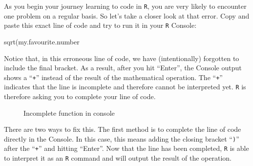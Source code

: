 \documentclass[
  letterpaper,
  DIV=11,
  numbers=noendperiod,
  oneside]{scrreprt}
\newenvironment{Shaded}{\begin{snugshade}}{\end{snugshade}}
\newcommand{\FunctionTok}[1]{\textcolor[rgb]{0.28,0.35,0.67}{#1}}
\newcommand{\NormalTok}[1]{\textcolor[rgb]{0.00,0.23,0.31}{#1}}
\begin{document}
As you begin your journey learning to code in \texttt{R}, you are very
likely to encounter one problem on a regular basis. So let's take a
closer look at that error. Copy and paste this exact line of code and
try to run it in your \texttt{R} Console:

\begin{Shaded}
\begin{Highlighting}[]
\FunctionTok{sqrt}\NormalTok{(my.favourite.number}
\end{Highlighting}
\end{Shaded}

Notice that, in this erroneous line of code, we have (intentionally)
forgotten to include the final bracket. As a result, after you hit
``Enter'', the Console output shows a ``\texttt{+}'' instead of the
result of the mathematical operation. The ``\texttt{+}'' indicates that
the line is incomplete and therefore cannot be interpreted yet.
\texttt{R} is therefore asking you to complete your line of code.

\begin{figure}


\caption{\label{fig-ConsoleUncompleteFunction}Incomplete function in
console}

\end{figure}%

There are two ways to fix this. The first method is to complete the line
of code directly in the Console. In this case, this means adding the
closing bracket ``\texttt{)}'' after the ``\texttt{+}'' and hitting
``Enter''. Now that the line has been completed, \texttt{R} is able to
interpret it as an \texttt{R} command and will output the result of the
operation.
\end{document}
